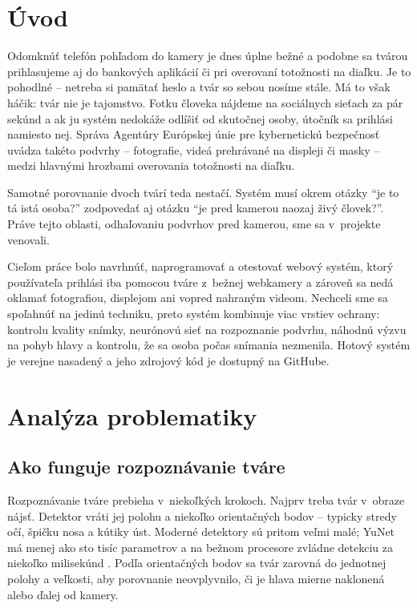 \documentclass[12pt,a4paper,oneside]{report}
\begin{document}
\tableofcontents
\listoffigures
\listoftables

\chapter{Úvod}

Odomknúť telefón pohľadom do kamery je dnes úplne bežné a podobne sa tvárou
prihlasujeme aj do bankových aplikácií či pri overovaní totožnosti na diaľku. Je to
pohodlné -- netreba si pamätať heslo a tvár so sebou nosíme stále. Má to však háčik:
tvár nie je tajomstvo. Fotku človeka nájdeme na sociálnych sieťach za pár sekúnd a ak
ju systém nedokáže odlíšiť od skutočnej osoby, útočník sa prihlási namiesto nej.
Správa Agentúry Európskej únie pre kybernetickú bezpečnosť \cite{enisa2022remote} uvádza
takéto podvrhy -- fotografie, videá prehrávané na displeji či masky -- medzi hlavnými
hrozbami overovania totožnosti na diaľku.

Samotné porovnanie dvoch tvárí teda nestačí. Systém musí okrem otázky \enquote{je to
tá istá osoba?} zodpovedať aj otázku \enquote{je pred kamerou naozaj živý človek?}.
Práve tejto oblasti, odhaľovaniu podvrhov pred kamerou, sme sa v~projekte venovali.

Cieľom práce bolo navrhnúť, naprogramovať a otestovať webový systém, ktorý
používateľa prihlási iba pomocou tváre z~bežnej webkamery a zároveň sa nedá
oklamať fotografiou, displejom ani vopred nahraným videom. Nechceli sme sa spoľahnúť
na jedinú techniku, preto systém kombinuje viac vrstiev ochrany: kontrolu kvality
snímky, neurónovú sieť na rozpoznanie podvrhu, náhodnú výzvu na pohyb hlavy
a kontrolu, že sa osoba počas snímania nezmenila. Hotový systém je verejne nasadený
a jeho zdrojový kód je dostupný na GitHube.

\chapter{Analýza problematiky}
\label{ch:teoria}

\section{Ako funguje rozpoznávanie tváre}

Rozpoznávanie tváre prebieha v~niekoľkých krokoch. Najprv treba tvár v~obraze nájsť.
Detektor vráti jej polohu a niekoľko orientačných bodov -- typicky stredy očí, špičku
nosa a kútiky úst. Moderné detektory sú pritom veľmi malé; YuNet má menej ako sto tisíc
parametrov a na bežnom procesore zvládne detekciu za niekoľko milisekúnd
\cite{wu2023yunet}. Podľa orientačných bodov sa tvár zarovná do jednotnej polohy
a veľkosti, aby porovnanie neovplyvnilo, či je hlava mierne naklonená alebo ďalej od
kamery.
\end{document}
